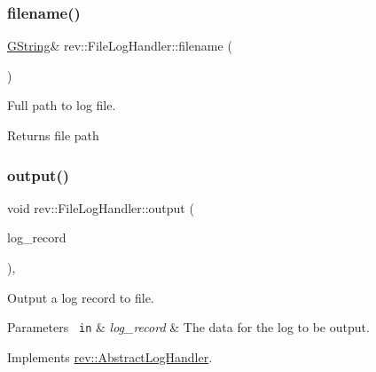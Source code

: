 \subsubsection{\texorpdfstring{filename()}{filename()}}
{\footnotesize\ttfamily \mbox{\hyperlink{classrev_1_1_g_string}{G\+String}}\& rev\+::\+File\+Log\+Handler\+::filename (\begin{DoxyParamCaption}{ }\end{DoxyParamCaption})\hspace{0.3cm}{\ttfamily [inline]}}



Full path to log file. 

\begin{DoxyReturn}{Returns}
file path 
\end{DoxyReturn}
\mbox{\label{classrev_1_1_file_log_handler_ae562434aed64d166aaa1d8660984a3be}} 
\subsubsection{\texorpdfstring{output()}{output()}}
{\footnotesize\ttfamily void rev\+::\+File\+Log\+Handler\+::output (\begin{DoxyParamCaption}\item[{\mbox{\hyperlink{classrev_1_1_log_record}{Log\+Record}} \&}]{log\+\_\+record }\end{DoxyParamCaption})\hspace{0.3cm}{\ttfamily [override]}, {\ttfamily [virtual]}}



Output a log record to file. 


\begin{DoxyParams}[1]{Parameters}
\mbox{\texttt{ in}}  & {\em log\+\_\+record} & The data for the log to be output. \\
\hline
\end{DoxyParams}


Implements \mbox{\hyperlink{classrev_1_1_abstract_log_handler_a0154255c9435f0ee66975be2d450b177}{rev\+::\+Abstract\+Log\+Handler}}.

\mbox{\label{classrev_1_1_file_log_handler_a224769152d428b0fec646c2965bb42e8}} 
